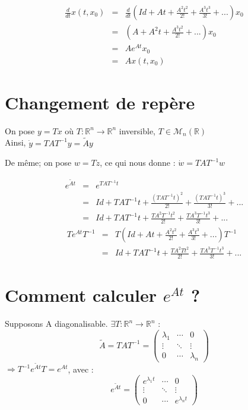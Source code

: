 
\begin{dem}
\begin{eqnarray*}
	\frac{d}{dt} x(t,x_0) &=& \frac{d}{dt} \left(Id + At + \frac{A^2t^2}{2!}+\frac{A^3t^3}{3!}+...\right) x_0\\
			      &=& \left(A+A^2t+\frac{A^3t^2}{2!} + ...\right) x_0 \\
			      &=& Ae^{At}x_0 \\
			      &=& Ax(t,x_0)
\end{eqnarray*}
\end{dem}

\section{Changement de repère}
On pose $y=Tx$ où $T:\mathbb{R}^n\to\mathbb{R}^n$ inversible, $T\in\mathcal{M}_n(\mathbb{R})$\\
Ainsi, $\dot{y}=TAT^{-1}y=\tilde{A}y$

De même; on pose $w=Tz$, ce qui nous donne : $\dot{w}=TAT^{-1}w$


\begin{dem}
\begin{eqnarray*}
	e^{\tilde{A}t}&=&e^{TAT^{-1}t}\\
		&=&Id+TAT^{-1}t+\frac{(TAT^{-1}t)^2}{2!}+\frac{(TAT^{-1}t)^3}{3!}+...\\
		&=&Id+TAT^{-1}t+\frac{TA^2T^{-1}t^2}{2!}+\frac{TA^3T^{-1}t^3}{3!}+...
\end{eqnarray*}
\begin{eqnarray*}
	Te^{At}T^{-1}&=&T\left(Id+At+\frac{A^2t^2}{2!}+\frac{A^3t^3}{3!}+...\right)T^{-1}\\
		&=&Id+TAT^{-1}t+\frac{TA^2Tt^2}{2!}+\frac{TA^3T^{-1}t^3}{3!}+...
\end{eqnarray*}
\end{dem}

\section{Comment calculer $e^{At}$ ?\\}
Supposons A diagonalisable. $\exists T:\mathbb{R}^n\to\mathbb{R}^n$ :
\[\tilde{A}=TAT^{-1}=\begin{pmatrix}\lambda_1 & \cdots & 0 \\ \vdots & \ddots & \vdots \\ 0 & \cdots & \lambda_n \end{pmatrix}\]
$\Rightarrow T^{-1}e^{\tilde{A}t}T=e^{At}$, avec :
\[e^{\tilde{A}t}=\begin{pmatrix}e^{\lambda_1 t} & \cdots & 0 \\ \vdots & \ddots & \vdots \\ 0 & \cdots & e^{\lambda_n t} \end{pmatrix}\]

